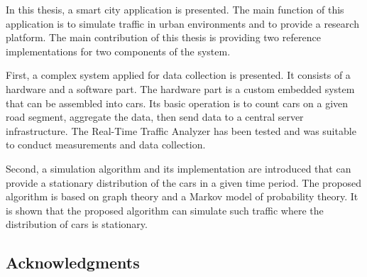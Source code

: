 \documentclass[b5paper,12pt]{report}
\theoremstyle{definition}
\begin{document}
In this thesis, a smart city application is presented. The main function of this application is to simulate traffic in urban environments and to provide a research platform. The main contribution of this thesis is providing two reference implementations for two components of the system.

First, a complex system applied for data collection is presented. It consists of a hardware and a software part. The hardware part is a custom embedded system that can be assembled into cars. Its basic operation is to count cars on a given road segment, aggregate the data, then send data to a central server infrastructure. The Real-Time Traffic Analyzer has been tested and was suitable to conduct measurements and data collection.

Second, a simulation algorithm and its implementation are introduced that can provide a stationary distribution of the cars in a given time period. The proposed algorithm is based on graph theory and a Markov model of probability theory. It is shown that the proposed algorithm can simulate such traffic where the distribution of cars is stationary.

\subsection*{Acknowledgments}
\end{document}
